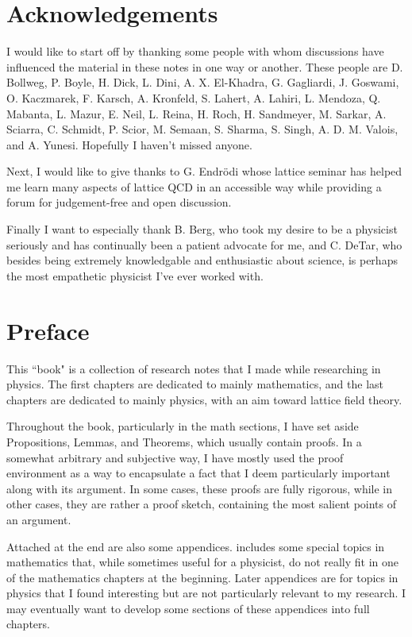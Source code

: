 \documentclass[12pt]{book}
\theoremstyle{definition}
\begin{document}
\chapter{Acknowledgements}

I would like to start off by thanking some people with whom discussions
have influenced the material in these notes in one way or another.
These people are
D. Bollweg,
P. Boyle,
H. Dick,
L. Dini,
A. X. El-Khadra,
G. Gagliardi,
J. Goswami,
O. Kaczmarek,
F. Karsch,
A. Kronfeld,
S. Lahert,
A. Lahiri,
L. Mendoza,
Q. Mabanta,
L. Mazur,
E. Neil,
L. Reina,
H. Roch,
H. Sandmeyer,
M. Sarkar,
A. Sciarra,
C. Schmidt,
P. Scior,
M. Semaan,
S. Sharma,
S. Singh,
A. D. M. Valois,
and
A. Yunesi.
Hopefully I haven't missed anyone.

Next, I would like to give thanks to G. Endr\"odi whose lattice seminar
has helped me learn many aspects of lattice QCD in an accessible way while
providing a forum for judgement-free and open discussion.

Finally I want to especially thank B. Berg, who took my desire to be a
physicist seriously and has continually been a patient advocate for me,
and C. DeTar, who besides being extremely knowledgable and enthusiastic about
science, is perhaps the most empathetic physicist I've ever worked with.


\chapter{Preface}
This ``book" is a collection of research notes that I made while researching in
physics. The first chapters are dedicated to mainly mathematics, and the last
chapters are dedicated to mainly physics, with an aim toward lattice field
theory. 

Throughout the book, particularly in the math sections, I have set aside
Propositions, Lemmas, and Theorems, which usually contain proofs. 
In a somewhat arbitrary and
subjective way, I have mostly used the proof environment as a way to encapsulate
a fact that I deem particularly important along with its argument.
In some cases, these proofs are fully rigorous, while in other cases, they are 
rather a proof sketch,
containing the most salient points of an argument. 

Attached at the end are also some appendices. 
 includes some special topics in mathematics 
that, while sometimes useful for a physicist, do not really fit in one of 
the mathematics chapters at the beginning.
Later appendices are for topics in physics that I found interesting but are
not particularly relevant to my research.
I may eventually want
to develop some sections of these appendices into full chapters.
\end{document}
